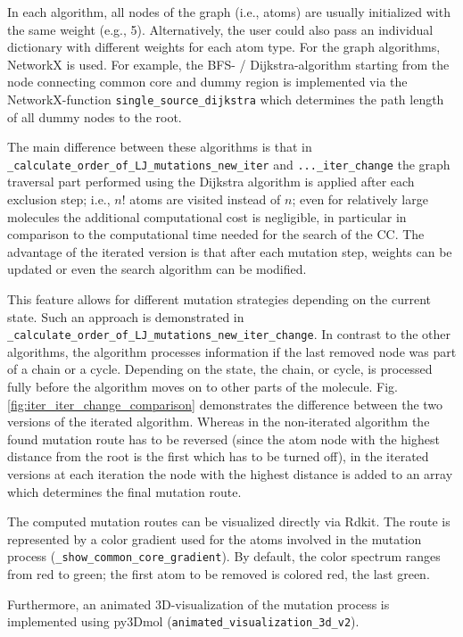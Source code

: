 In each algorithm, all nodes of the graph (i.e., atoms) are usually
initialized with the same weight (e.g., 5). Alternatively, the user
could also pass an individual dictionary with different weights for
each atom type.
For the graph algorithms, NetworkX is used. For example,
the BFS- / Dijkstra-algorithm starting from the node connecting common
core and dummy region is implemented via the NetworkX-function \texttt{single\_source\_dijkstra}
which determines the path length of all dummy nodes to the root.

The main difference between these algorithms is that in \texttt{\_calculate\_order\_of\_LJ\_mutations\_new\_iter}
and \texttt{...\_iter\_change} the graph traversal part performed
using the Dijkstra algorithm is applied after each exclusion step; i.e., $n!$ atoms are visited instead of $n$; even for relatively large molecules the additional computational cost is negligible, in particular in comparison
to the computational time needed for the search of the CC.
The advantage of the iterated version is that after each mutation step, weights can be
updated or even the search algorithm can be modified. 

This feature allows for different mutation strategies depending
on the current state. Such an approach is demonstrated in \texttt{\_calculate\_order\_of\_LJ\_mutations\_new\_iter\_change}.
In contrast to the other algorithms, the algorithm processes information
if the last removed node was part of a chain or a cycle. Depending
on the state, the chain, or cycle, is processed fully before the algorithm
moves on to other parts of the molecule. Fig. \ref{fig:iter_iter_change_comparison} demonstrates the difference between the two versions of the iterated algorithm.
Whereas in the non-iterated algorithm the found mutation route has to be reversed (since the atom node with the highest distance from the root is the first which has to be turned off), in the iterated versions at each iteration the node with the highest distance is added to an array which determines the final mutation route.

The computed mutation routes can be visualized directly via Rdkit. 
The route is represented by a color gradient used for the atoms involved
in the mutation process (\texttt{\_show\_common\_core\_gradient}). By default, the color spectrum ranges from red to green; the first atom to be removed is colored red, the last green.

Furthermore, an animated 3D-visualization of the mutation process
is implemented using py3Dmol (\texttt{animated\_visualization\_3d\_v2})\cite{key-4}. 




